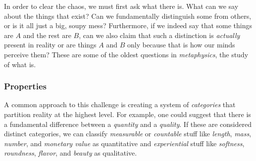 

In order to clear the chaos, we must first ask what there is. What can we say about the things that exist? Can we fundamentally distinguish some from others, or is it all just a big, soupy mess? Furthermore, if we indeed say that some things are $A$ and the rest are $B$, can we also claim that such a distinction is \textit{actually} present in reality or are things $A$ and $B$ only because that is how our minds perceive them? These are some of the oldest questions in \textit{metaphysics}, the study of what is. \\





\subsubsection{Properties}


A common approach to this challenge is creating a system of \textit{categories} that partition reality at the highest level. For example, one could suggest that there is a fundamental difference between a \textit{quantity} and a \textit{quality}. If these are considered distinct categories, we can classify \textit{measurable} or \textit{countable} stuff like \textit{length}, \textit{mass}, \textit{number}, and \textit{monetary value} as quantitative and \textit{experiential} stuff like \textit{softness}, \textit{roundness}, \textit{flavor}, and \textit{beauty} as qualitative. \\

